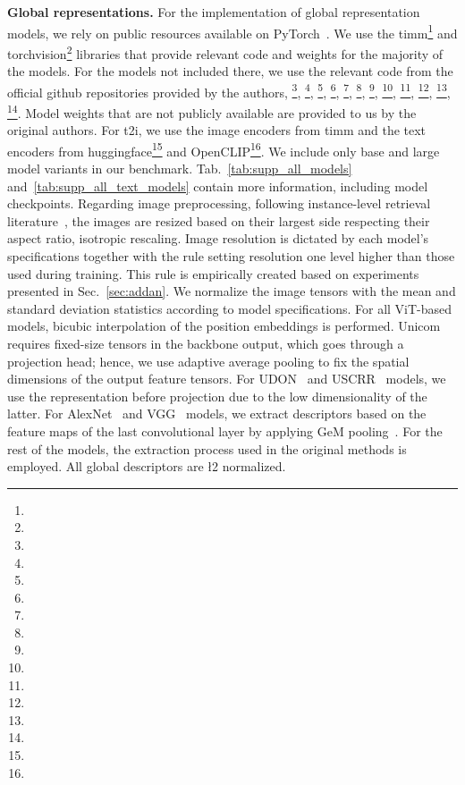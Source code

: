\noindent\textbf{Global representations.}
For the implementation of global representation models, we rely on public resources available on PyTorch~\cite{pgm+19}. We use the timm\footnote{} and torchvision\footnote{} libraries that provide relevant code and weights for the majority of the models. For the models not included there, we use the relevant code from the official github repositories provided by the authors, \ie
\cite{odm+24}\footnote{},
\cite{ctm+21}\footnote{},
\cite{cmm+20}\footnote{},
\cite{hfw+20}\footnote{},
\cite{ptm+22}\footnote{},
\cite{kjk23}\footnote{},
\cite{lsl+22}\footnote{},
\cite{sck+23}\footnote{},
\cite{ady+23}\footnote{},
\cite{swl+24}\footnote{},
\cite{ycc+23}\footnote{},
\cite{yca+24}\footnote{}. Model weights that are not publicly available are provided to us by the original authors. 
For t2i, we use the image encoders from timm and the text encoders from huggingface\footnote{} and OpenCLIP\footnote{}. We include only base and large model variants in our benchmark. Tab.~\ref{tab:supp_all_models} and~\ref{tab:supp_all_text_models} contain more information, including model checkpoints. Regarding image preprocessing, following instance-level retrieval literature~\cite{sck+23,rtc19,lsl+22}, the images are resized based on their largest side respecting their aspect ratio, \ie isotropic rescaling. Image resolution is dictated by each model's specifications together with the rule setting resolution one level higher than those used during training. This rule is empirically created based on experiments presented in Sec.~\ref{sec:addan}. We normalize the image tensors with the mean and standard deviation statistics according to model specifications. For all ViT-based models, bicubic interpolation of the position embeddings is performed. Unicom~\cite{ady+23} requires fixed-size tensors in the backbone output, which goes through a projection head; hence, we use adaptive average pooling to fix the spatial dimensions of the output feature tensors. For UDON~\cite{yca+24} and USCRR~\cite{ycc+23} models, we use the representation before projection due to the low dimensionality of the latter. For AlexNet~\cite{ksh12} and VGG~\cite{sz14} models, we extract descriptors based on the feature maps of the last convolutional layer by applying GeM pooling~\cite{rtc19}. For the rest of the models, the extraction process used in the original methods is employed. All global descriptors are \l2 normalized.


